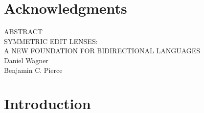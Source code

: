 \documentclass[12pt]{report}
\numberwithin{equation}{section}
\def\thetitle{\uppercase{Symmetric Edit Lenses:\\A New Foundation For Bidirectional Languages}}
\def\theauthor{Daniel Wagner}
\def\theadvisor{Benjamin C. Pierce}
\begin{document}
\chapter*{Acknowledgments}

\newpage
\vspace*{\fill}

\begin{center}
  ABSTRACT\\
\vspace{.5in}
\thetitle\\
\vspace{.5in}
  \theauthor\\
  \theadvisor
\end{center}

\doublespacing
\noindent


\vspace*{\fill}

\newpage

\tableofcontents

\newpage

\listoftables

\listoffigures

\newpage
\singlespacing
{}

\chapter{Introduction}
\label{chap:introduction}
\label{chap:intro}


\end{document}
